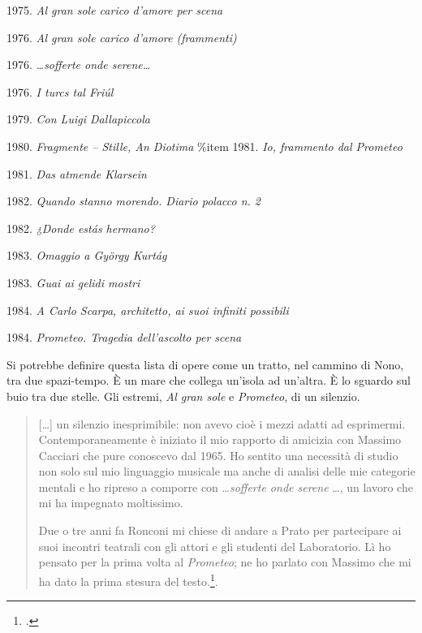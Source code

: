 \begin{compactitem}
  \item 1975.	\emph{Al gran sole carico d’amore per scena}
  \item 1976.	\emph{Al gran sole carico d’amore (frammenti)}
  \item 1976.	\emph{\ldots sofferte onde serene\ldots}
  \item 1976.	\emph{I turcs tal Friúl}
  \item 1979.   \emph{Con Luigi Dallapiccola}
  \item 1980.	\emph{Fragmente – Stille, An Diotima}
  \%item 1981.	\emph{Io, frammento dal Prometeo}
  \item 1981.	\emph{Das atmende Klarsein}
  \item 1982.	\emph{Quando stanno morendo. Diario polacco n. 2}
  \item 1982.	\emph{¿Donde estás hermano?}
  \item 1983.	\emph{Omaggio a György Kurtág}
  \item 1983.	\emph{Guai ai gelidi mostri}
  \item 1984.	\emph{A Carlo Scarpa, architetto, ai suoi infiniti possibili}
  \item 1984.	\emph{Prometeo. Tragedia dell’ascolto per scena}
\end{compactitem}

Si potrebbe definire questa lista di opere come un tratto, nel cammino di Nono, tra due spazi-tempo. È un mare che collega un'isola ad un'altra. È lo sguardo sul buio tra due stelle. Gli estremi, \emph{Al gran sole} e \emph{Prometeo}, di un silenzio.

\begin{quote}
[\ldots] un silenzio inesprimibile: non avevo cioè i mezzi adatti ad esprimermi. Contemporaneamente è iniziato il mio rapporto di amicizia con Massimo Cacciari che pure conoscevo dal 1965. Ho sentito una necessità di studio non solo sul mio linguaggio musicale ma anche di analisi delle mie categorie mentali e ho ripreso a comporre con \ldots \emph{sofferte onde serene} \ldots, un lavoro che mi ha impegnato moltissimo.

	Due o tre anni fa Ronconi mi chiese di andare a Prato per partecipare ai suoi incontri teatrali con gli attori e gli studenti del Laboratorio. Lì ho pensato per la prima volta al \emph{Prometeo}; ne ho parlato con Massimo che mi ha dato la prima stesura del testo.\footcite[vol. II p. 245, \emph{Intervista di Renato Garavaglia 1979-80}]{nono:scrcol}.
\end{quote}

